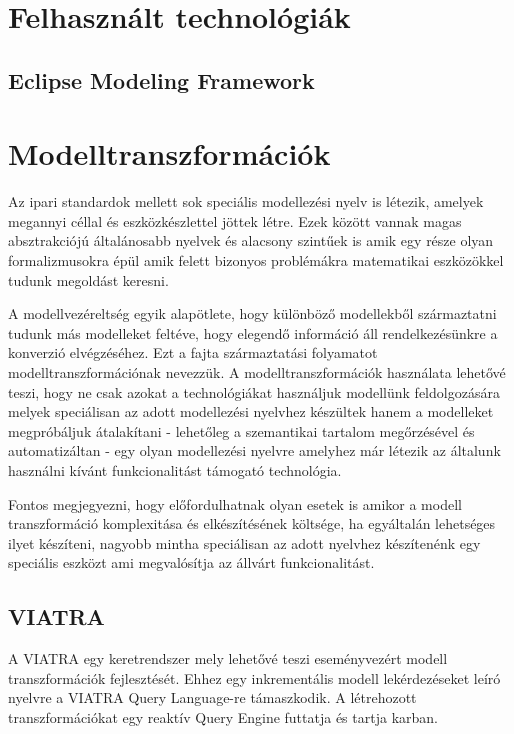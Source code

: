 

\section{Felhasznált technológiák}
\subsection{Eclipse Modeling Framework}
\section{Modelltranszformációk}

Az ipari standardok mellett sok speciális modellezési nyelv is létezik, amelyek megannyi céllal és eszközkészlettel jöttek létre. Ezek között vannak magas absztrakciójú általánosabb nyelvek és alacsony szintűek is amik egy része olyan formalizmusokra épül amik felett bizonyos problémákra matematikai eszközökkel tudunk megoldást keresni.

A modellvezéreltség egyik alapötlete, hogy különböző modellekből származtatni tudunk más modelleket feltéve, hogy elegendő információ áll rendelkezésünkre a konverzió elvégzéséhez. Ezt a fajta származtatási folyamatot modelltranszformációnak nevezzük. A modelltranszformációk használata lehetővé teszi, hogy ne csak azokat a technológiákat használjuk modellünk feldolgozására melyek speciálisan az adott modellezési nyelvhez készültek hanem a modelleket megpróbáljuk átalakítani - lehetőleg a szemantikai tartalom megőrzésével és automatizáltan - egy olyan modellezési nyelvre amelyhez már létezik az általunk használni kívánt funkcionalitást támogató technológia.

Fontos megjegyezni, hogy előfordulhatnak olyan esetek is amikor a modell transzformáció komplexitása és elkészítésének költsége, ha egyáltalán lehetséges ilyet készíteni, nagyobb mintha speciálisan az adott nyelvhez készítenénk egy speciális eszközt ami megvalósítja az állvárt funkcionalitást.

\subsection{VIATRA}

A VIATRA egy keretrendszer mely lehetővé teszi eseményvezért modell transzformációk fejlesztését. Ehhez egy inkrementális modell lekérdezéseket leíró nyelvre a VIATRA Query Language-re támaszkodik. A létrehozott transzformációkat egy reaktív Query Engine futtatja és tartja karban.

